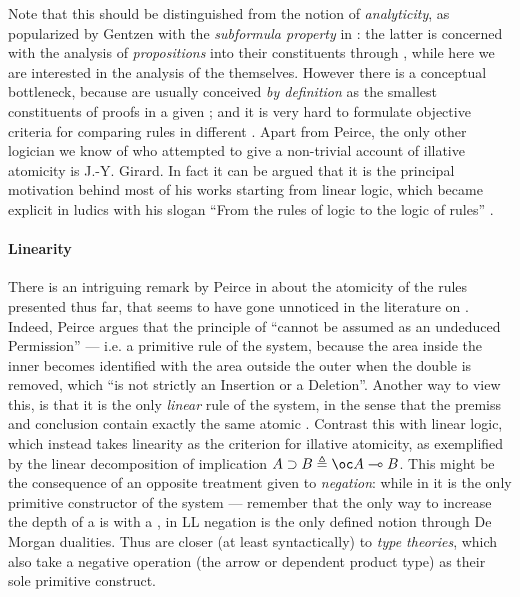 \begin{scope}
Note that this should be distinguished from the notion of \emph{analyticity}, as
popularized by Gentzen with the \emph{subformula property} in : the latter is concerned with the analysis of \emph{propositions} into
their constituents through , while here we are interested in
the analysis of the  themselves. However there is a conceptual bottleneck, because
 are usually conceived \emph{by definition} as the smallest
constituents of proofs in a given ; and it is very hard to
formulate objective criteria for comparing rules in different . Apart from Peirce, the only other logician we know of who attempted to
give a non-trivial account of illative atomicity is J.-Y. Girard. In fact it can
be argued that it is the principal motivation behind most of his works starting
from linear logic, which became explicit in ludics with his slogan ``From the
rules of logic to the logic of rules'' \cite{girard_locus_2001}.

\paragraph{Linearity}

There is an intriguing remark by Peirce in
\cite[pp.~536--537]{peirce_prolegomena_1906} about the atomicity of the rules
presented thus far, that seems to have gone unnoticed in the literature on .
Indeed, Peirce argues that the principle of  ``cannot be
assumed as an undeduced Permission'' --- i.e. a primitive rule of the system,
because the area inside the inner  becomes identified with the area outside
the outer  when the double  is removed, which ``is not strictly an
Insertion or a Deletion''. Another way to view this, is that it is the only
\emph{linear} rule of the system, in the sense that the premiss and conclusion
contain exactly the same atomic . Contrast this with linear logic, which
instead takes linearity as the criterion for illative atomicity, as exemplified
by the linear decomposition of implication $A \limp B \defeq \oc A \multimap B$.
This might be the consequence of an opposite treatment given to \emph{negation}:
while in  it is the only primitive constructor of the system --- remember that
the only way to increase the depth of a  is with a , in LL negation is
the only defined notion through De Morgan dualities. Thus  are closer (at
least syntactically) to \emph{type theories}, which also take a negative
operation (the arrow or dependent product type) as their sole primitive
construct.


\end{scope}
